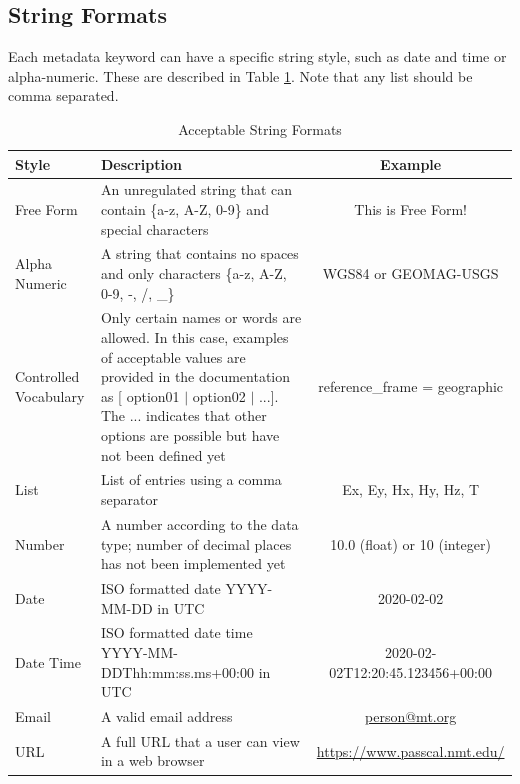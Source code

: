 \documentclass[12pt]{article}
\begin{document}
\subsection{String Formats}

Each metadata keyword can have a specific string style, such as date and time or alpha-numeric.  These are described in Table \ref{tab:values}.  Note that any list should be comma separated.

\begin{table}[hb!]
	\centering
	\caption[Acceptable String Formats]{Acceptable String Formats}
	\begin{tabular}{>{\raggedright}p{.9in}>{\raggedright}p{3.2in}c}
		\toprule
		\textbf{Style} & \textbf{Description}  & \textbf{Example} \\ \midrule
		Free Form & An unregulated string that can contain \{a-z, A-Z, 0-9\} and special characters & This is Free Form! \\ \midrule
		
		Alpha Numeric & A string that contains no spaces and only characters \{a-z, A-Z, 0-9, -, /, \_\} & WGS84 or GEOMAG-USGS \\ \midrule
		Controlled Vocabulary & Only certain names or words are allowed. In this case, examples of acceptable values are provided in the documentation as [ option01 $|$ option02 $|$ ...]. The ... indicates that other options are possible but have not been defined yet &  reference\_frame = geographic \\ \midrule
		List & List of entries using a comma separator & Ex, Ey, Hx, Hy, Hz, T \\ \midrule
		Number & A number according to the data type; number of decimal places has not been implemented yet & 10.0 (float) or 10 (integer) \\ \midrule
		Date & ISO formatted date YYYY-MM-DD in UTC & 2020-02-02 \\ \midrule
		Date Time & ISO formatted date time YYYY-MM-DDThh:mm:ss.ms+00:00 in UTC & 2020-02-02T12:20:45.123456+00:00 \\ \midrule
		Email & A valid email address & \url{person@mt.org} \\ \midrule
		URL & A full URL that a user can view in a web browser  &  \url{https://www.passcal.nmt.edu/} \\ \bottomrule
		
		
	\end{tabular}
	\label{tab:values}
\end{table}
\end{document}
